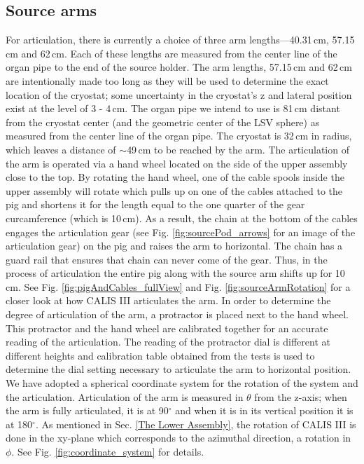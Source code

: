 \subsection{Source arms}
  For articulation, there is currently a choice of three arm lengths---40.31\,cm,  57.15\,cm and 62\,cm.  Each of these lengths are measured from the center line of the organ pipe to the end of the source holder.  The arm lengths, 57.15\,cm and 62\,cm are intentionally made too long as they will be used to determine the exact location of the cryostat; some uncertainty in the cryostat's z and lateral position exist at the level of 3 - 4\,cm. The organ pipe we intend to use is 81\,cm distant from the cryostat center (and the geometric center of the LSV sphere) as measured from the center line of the organ pipe. The cryostat is 32\,cm in radius, which leaves a distance of $\sim$49\,cm to be reached  by the arm.  The articulation of the arm is operated via a hand wheel located on the side of the upper assembly close to the top.  By rotating the hand wheel, one of the cable spools inside the upper assembly will rotate which pulls up on one of the cables attached to the pig and shortens it for the length equal to the one quarter of the gear curcamference (which is 10\,cm).  As a result, the chain at the bottom of the cables engages the articulation gear (see Fig. \ref{fig:sourcePod_arrows} for an image of the articulation gear) on the pig and raises the arm to horizontal.  The chain has a guard rail that ensures that chain can never come of the gear. Thus, in the process of articulation the entire pig along with the source arm shifts up for 10\,cm.  See Fig. \ref{fig:pigAndCables_fullView} and  Fig. \ref{fig:sourceArmRotation} for a closer look at how CALIS III articulates the arm. In order to determine the degree of articulation of the arm, a protractor is placed next to the hand wheel.  This protractor and the hand wheel are calibrated together for an accurate reading of the articulation. The reading of the protractor dial is different at different heights and calibration table obtained from the tests is used to determine the dial setting necessary to articulate the arm to horizontal position. We have adopted a spherical coordinate system for the rotation of the system and the articulation.  Articulation of the arm is measured in $\theta$ from the z-axis; when the arm is fully articulated, it is at 90$^{\circ}$ and when it is in its vertical position it is at 180$^{\circ}$.  As mentioned in Sec. \ref{The Lower Assembly}, the rotation of CALIS III is done in the xy-plane which corresponds to the azimuthal direction, a rotation in $\phi$.  See Fig. \ref{fig:coordinate_system} for details. 
  
